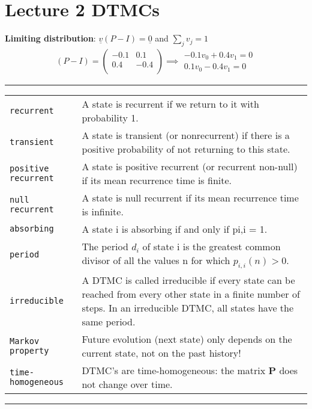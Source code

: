 \section{Lecture 2 DTMCs}

\textbf{Limiting distribution}: $\underline{v}(P - I) = \underline{0}$ and $\sum_{j} v_{j} = 1$
\begin{align*}
(P-I) = \begin{pmatrix}
  -0.1 & 0.1  \\
  0.4 & -0.4 \\
 \end{pmatrix} \implies 
	\begin{split} 	
 	-0.1v_{0} + 0.4v_{1} = 0\\ 
	0.1v_{0} - 0.4v_{1} = 0
	\end{split}
\end{align*}
\hrule
{}
\begin{tabular}{@{}p{\the\MyLen}@{}p{\linewidth-\the\MyLen}@{}}
\verb!recurrent!				&	A state is recurrent if we return to it with probability 1.\\
\verb!transient!				&	A state is transient (or nonrecurrent) if there is a positive probability of not returning to this state.\\
\verb!positive recurrent!		&	A state is positive recurrent (or recurrent non-null) if its mean recurrence time is finite. \\
\verb!null recurrent!			&	A state is null recurrent if its mean recurrence time is infinite. \\
\verb!absorbing!				&	A state i is absorbing if and only if pi,i = 1. \\
\verb!period!					& The period $d_{i}$ of state i is the greatest common divisor of all the values n for which $p_{i,i}(n) > 0$.\\
\verb!irreducible!				& A DTMC is called irreducible if every state can be reached from every other state in a finite number of steps. In an irreducible DTMC, all states have the same period.\\
\verb!Markov property!			& Future evolution (next state) only depends on the current state, not on the past history!\\
\verb!time-homogeneous!			& DTMC’s are time-homogeneous: the matrix \textbf{P} does not change over time.\\
\end{tabular}
\newline
\hrule
